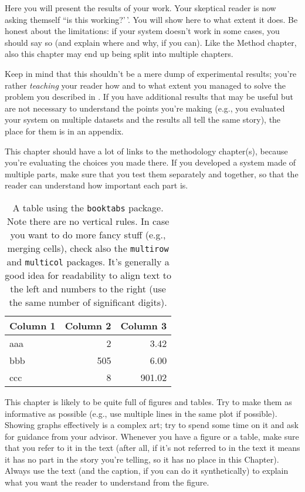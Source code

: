 Here you will present the results of your work. Your skeptical reader is
now asking themself ``is this working?'\,'. You will show here to what
extent it does. Be honest about the limitations: if your system doesn't
work in some cases, you should say so (and explain where and why, if you
can). Like the Method chapter, also this chapter may end up being split
into multiple chapters.

Keep in mind that this shouldn't be a mere dump of experimental results;
you're rather \emph{teaching} your reader how and to what extent you
managed to solve the problem you described in .
If you have additional results that may be useful but are not necessary
to understand the points you're making (e.g., you evaluated your system
on multiple datasets and the results all tell the same story), the place
for them is in an appendix.

This chapter should have a lot of links to the methodology chapter(s),
because you're evaluating the choices you made there. If you developed a
system made of multiple parts, make sure that you test them separately
and together, so that the reader can understand how important each part
is.

\begin{table}
    \centering
    \begin{tabular}{lrr}
        \toprule
        \textbf{Column 1} & \textbf{Column 2} & \textbf{Column 3} \\
        \midrule
        aaa &   2 &   3.42 \\
        bbb & 505 &   6.00 \\
        ccc &   8 & 901.02 \\
        \bottomrule
    \end{tabular}
    \caption{A table using the \latex \texttt{booktabs} package. Note there are no vertical
    rules. In case you want to do more fancy stuff (e.g., merging cells), check also the
    \texttt{multirow} and \texttt{multicol} packages. It's generally a good idea for readability
    to align text to the left and numbers to the right (use the same number of significant digits).}
    \label{tab:table}
\end{table}

This chapter is likely to be quite full of figures and tables. Try to
make them as informative as possible (e.g., use multiple lines in the
same plot if possible). Showing graphs effectively is a complex art; try
to spend some time on it and ask for guidance from your advisor.
Whenever you have a figure or a table, make sure that you refer to it in
the text (after all, if it's not referred to in the text it means it has
no part in the story you're telling, so it has no place in this
Chapter). Always use the text (and the caption, if you can do it
synthetically) to explain what you want the reader to understand from
the figure.

